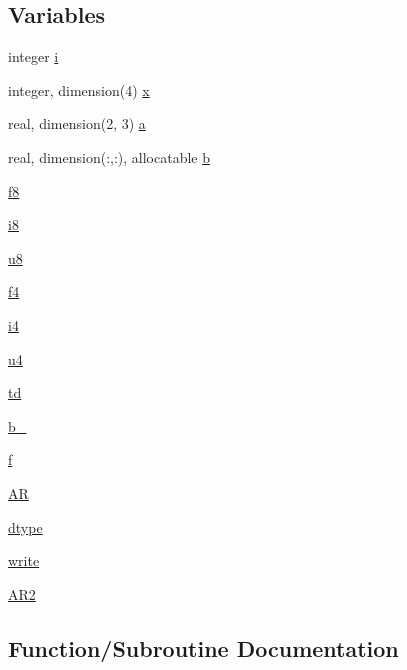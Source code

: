 \subsection*{Variables}
\begin{DoxyCompactItemize}
\item 
integer \hyperlink{namespacemod_a8a14377c000c6d68d147c76d36fbd53d}{i}
\item 
integer, dimension(4) \hyperlink{namespacemod_ac711af5fe944dbb95690bef3ed0da8c4}{x}
\item 
real, dimension(2, 3) \hyperlink{namespacemod_a3c8f710d4976f60a184c79844967ea3e}{a}
\item 
real, dimension(\+:,\+:), allocatable \hyperlink{namespacemod_ae5a0da2d953b0d45daa9398eee04c951}{b}
\item 
\hyperlink{namespacemod_a3a73e24f6bda16e2e21f82e174ed1b92}{f8}
\item 
\hyperlink{namespacemod_a1f0c8890e6c05338b679f879237dffb5}{i8}
\item 
\hyperlink{namespacemod_a387bc258334161295c7c0bd33c673cee}{u8}
\item 
\hyperlink{namespacemod_a4fce820e7bf01a95335ac36b1a1196e5}{f4}
\item 
\hyperlink{namespacemod_a8fbbbbf7078d26107f8717b0a081b974}{i4}
\item 
\hyperlink{namespacemod_aee8518a73106c505a79bd277322fe553}{u4}
\item 
\hyperlink{namespacemod_a6d1cd5ca3e54f7d4fb8b7e9ce24cfadc}{td}
\item 
\hyperlink{namespacemod_a1d3e7195cf5c30fc934a80027bb4c06e}{b\+\_\+}
\item 
\hyperlink{namespacemod_a36799d8a4c3d2de6bc1166b1cee34372}{f}
\item 
\hyperlink{namespacemod_a4f401ab50cd047642f8f42d3ac55a9dc}{AR}
\item 
\hyperlink{namespacemod_a504af196a58ddd24d6fbbbb71a849947}{dtype}
\item 
\hyperlink{namespacemod_a40e843d3f1980a2d8eadf509137b9f8d}{write}
\item 
\hyperlink{namespacemod_acc354dc6844c64638f6056e391cd8e11}{A\+R2}
\end{DoxyCompactItemize}


\subsection{Function/\+Subroutine Documentation}
\mbox{\label{namespacemod_aecf9fac458f0baf96a355cf347730783}} 
